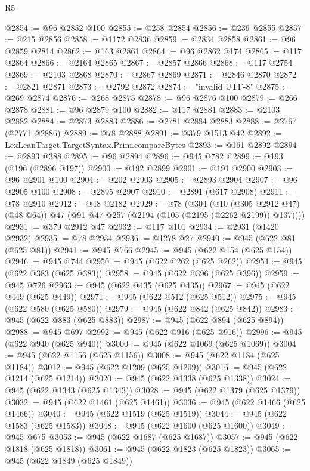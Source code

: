 \begin{lexlean}{R5}
\begin{coremodule}
@2854 := @96 @2852 @100
@2855 := @258 @2854
@2856 := @239 @2855
@2857 := @215 @2856
@2858 := @1172 @2836
@2859 := @2834 @2858
@2861 := @96 @2859 @2814
@2862 := @163 @2861
@2864 := @96 @2862 @174
@2865 := @117 @2864
@2866 := @2164 @2865
@2867 := @2857 @2866
@2868 := @117 @2754
@2869 := @2103 @2868
@2870 := @2867 @2869
@2871 := @2846 @2870
@2872 := @2821 @2871
@2873 := @2792 @2872
@2874 := "invalid UTF-8"
@2875 := @269 @2874
@2876 := @268 @2875
@2878 := @96 @2876 @100
@2879 := @266 @2878
@2881 := @96 @2879 @100
@2882 := @117 @2881
@2883 := @2103 @2882
@2884 := @2873 @2883
@2886 := @2781 @2884 @2883
@2888 := @2767 (@2771 @2886)
@2889 := @78 @2888
@2891 := @379 @1513 @42
@2892 := LexLeanTarget.TargetSyntax.Prim.compareBytes
@2893 := @161 @2892
@2894 := @2893 @388
@2895 := @96 @2894
@2896 := @945 @782
@2899 := @193 (@196 (@2896 @197))
@2900 := @192 @2899
@2901 := @191 @2900
@2903 := @96 @2901 @100
@2904 := @202 @2903
@2905 := @2893 @2904
@2907 := @96 @2905 @100
@2908 := @2895 @2907
@2910 := @2891 (@617 @2908)
@2911 := @78 @2910
@2912 := @48 @2182
@2929 := @78
    (@304
      (@10 (@305 @2912 @47) (@48 @64))
      @47
      (@91 @47 @257 (@2194 (@105 (@2195 (@2262 @2199)) @137))))
@2931 := @379 @2912 @47
@2932 := @117 @101
@2934 := @2931 (@1420 @2932)
@2935 := @78 @2934
@2936 := @1278 @27
@2940 := @945 (@622 @81 (@625 @81))
@2941 := @945 @766
@2945 := @945 (@622 @154 (@625 @154))
@2946 := @945 @744
@2950 := @945 (@622 @262 (@625 @262))
@2954 := @945 (@622 @383 (@625 @383))
@2958 := @945 (@622 @396 (@625 @396))
@2959 := @945 @726
@2963 := @945 (@622 @435 (@625 @435))
@2967 := @945 (@622 @449 (@625 @449))
@2971 := @945 (@622 @512 (@625 @512))
@2975 := @945 (@622 @580 (@625 @580))
@2979 := @945 (@622 @842 (@625 @842))
@2983 := @945 (@622 @883 (@625 @883))
@2987 := @945 (@622 @894 (@625 @894))
@2988 := @945 @697
@2992 := @945 (@622 @916 (@625 @916))
@2996 := @945 (@622 @940 (@625 @940))
@3000 := @945 (@622 @1069 (@625 @1069))
@3004 := @945 (@622 @1156 (@625 @1156))
@3008 := @945 (@622 @1184 (@625 @1184))
@3012 := @945 (@622 @1209 (@625 @1209))
@3016 := @945 (@622 @1214 (@625 @1214))
@3020 := @945 (@622 @1338 (@625 @1338))
@3024 := @945 (@622 @1343 (@625 @1343))
@3028 := @945 (@622 @1379 (@625 @1379))
@3032 := @945 (@622 @1461 (@625 @1461))
@3036 := @945 (@622 @1466 (@625 @1466))
@3040 := @945 (@622 @1519 (@625 @1519))
@3044 := @945 (@622 @1583 (@625 @1583))
@3048 := @945 (@622 @1600 (@625 @1600))
@3049 := @945 @675
@3053 := @945 (@622 @1687 (@625 @1687))
@3057 := @945 (@622 @1818 (@625 @1818))
@3061 := @945 (@622 @1823 (@625 @1823))
@3065 := @945 (@622 @1849 (@625 @1849))

\end{coremodule}
\end{lexlean}

